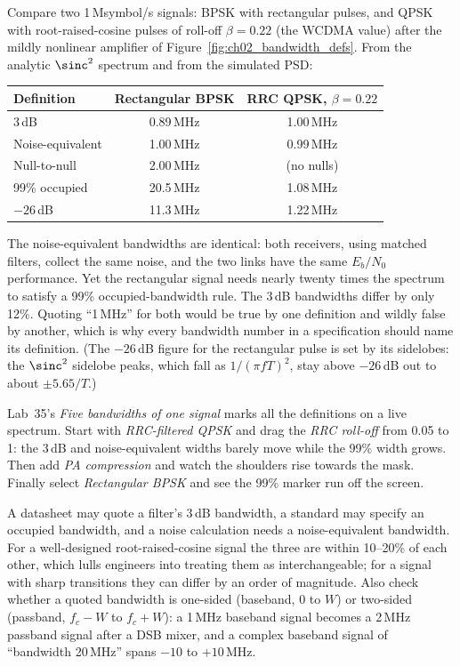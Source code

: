 \begin{worked}
Compare two 1\,Msymbol/s signals: BPSK with rectangular pulses, and QPSK with root-raised-cosine
pulses of roll-off $\beta=0.22$ (the WCDMA value) after the mildly nonlinear amplifier of
Figure~\ref{fig:ch02_bandwidth_defs}. From the analytic $\sinc^2$ spectrum and from the simulated PSD:

\begin{center}\small
\begin{tabular}{@{}lcc@{}}
\toprule
Definition & Rectangular BPSK & RRC QPSK, $\beta=0.22$\\
\midrule
3\,dB & 0.89\,MHz & 1.00\,MHz\\
Noise-equivalent & 1.00\,MHz & 0.99\,MHz\\
Null-to-null & 2.00\,MHz & (no nulls)\\
99\% occupied & 20.5\,MHz & 1.08\,MHz\\
$-26$\,dB & 11.3\,MHz & 1.22\,MHz\\
\bottomrule
\end{tabular}
\end{center}
The noise-equivalent bandwidths are identical: both receivers, using matched filters, collect the
same noise, and the two links have the same $E_b/N_0$ performance. Yet the rectangular signal
needs nearly twenty times the spectrum to satisfy a 99\% occupied-bandwidth rule. The 3\,dB
bandwidths differ by only 12\%. Quoting ``1\,MHz'' for both would be true by one definition and
wildly false by another, which is why every bandwidth number in a specification should name its
definition. (The $-26$\,dB figure for the rectangular pulse is set by its sidelobes: the
$\sinc^2$ sidelobe peaks, which fall as $1/(\pi fT)^2$, stay above $-26$\,dB out to about
$\pm5.65/T$.)
\end{worked}

\begin{tryit}
Lab~35's \emph{Five bandwidths of one signal} marks all the definitions on a live spectrum. Start
with \emph{RRC-filtered QPSK} and drag the \emph{RRC roll-off} from 0.05 to 1: the 3\,dB and
noise-equivalent widths barely move while the 99\% width grows. Then add \emph{PA compression} and
watch the shoulders rise towards the mask. Finally select \emph{Rectangular BPSK} and see the 99\%
marker run off the screen.
\end{tryit}

\begin{pitfall}
A datasheet may quote a filter's 3\,dB bandwidth, a standard may specify an occupied
bandwidth, and a noise calculation needs a noise-equivalent bandwidth. For a well-designed
root-raised-cosine signal the three are within 10--20\% of each other, which lulls engineers into
treating them as interchangeable; for a signal with sharp transitions they can differ by an order
of magnitude. Also check whether a quoted bandwidth is one-sided (baseband, $0$ to $W$) or two-sided
(passband, $f_c-W$ to $f_c+W$): a 1\,MHz baseband signal becomes a 2\,MHz passband signal after a DSB
mixer, and a complex baseband signal of ``bandwidth 20\,MHz'' spans $-10$ to $+10$\,MHz.
\end{pitfall}

